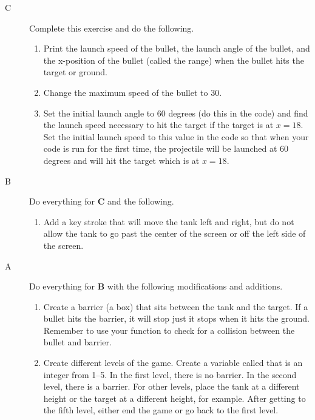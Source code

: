 \begin{description}

\item[C] Complete this exercise and do the following.

\begin{enumerate}
	\item Print the launch speed of the bullet, the launch angle of the bullet, and the x-position of the bullet (called the range) when the bullet hits the target or ground.
	\item Change the maximum speed of the bullet to 30.
	\item Set the initial launch angle to 60 degrees (do this in the code) and find the launch speed necessary to hit the target if the target is at $x=18$. Set the initial launch speed to this value in the code so that when your code is run for the first time, the projectile will be launched at 60 degrees and will hit the target which is at $x=18$.
\end{enumerate}

\item[B] Do everything for {\bf C} and the following.

\begin{enumerate}
	\item Add a key stroke that will move the tank left and right, but do not allow the tank to go past the center of the screen or off the left side of the screen.
\end{enumerate}

\item[A] Do everything for {\bf B} with the following modifications and additions.

\begin{enumerate}
	\item Create a barrier (a box) that sits between the tank and the target. If a bullet hits the barrier, it will stop just it stops when it hits the ground. Remember to use your  function to check for a collision between the bullet and barrier.
	\item Create different levels of the game. Create a variable called  that is an integer from 1--5. In the first level, there is no barrier. In the second level, there is a barrier. For other levels, place the tank at a different height or the target at a different height, for example. After getting to the fifth level, either end the game or go back to the first level.
\end{enumerate}




\end{description}

